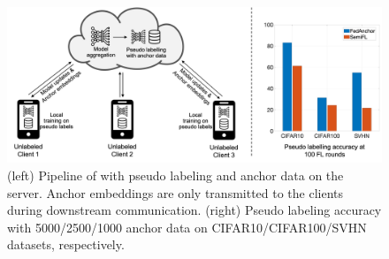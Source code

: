\documentclass[withindex,glossary,firstyr]{cam-thesis}
\begin{document}
\begin{figure}[t]
\centering
    \includegraphics[width=\linewidth]{pip.png}
\caption{\small (left) Pipeline of \method with pseudo labeling and anchor data on the server. Anchor embeddings are only transmitted to the clients during downstream communication. (right) Pseudo labeling accuracy with 5000/2500/1000 anchor data on CIFAR10/CIFAR100/SVHN datasets, respectively.}
\label{fig:pip}
\vspace{-5mm}
\end{figure}









\end{document}
